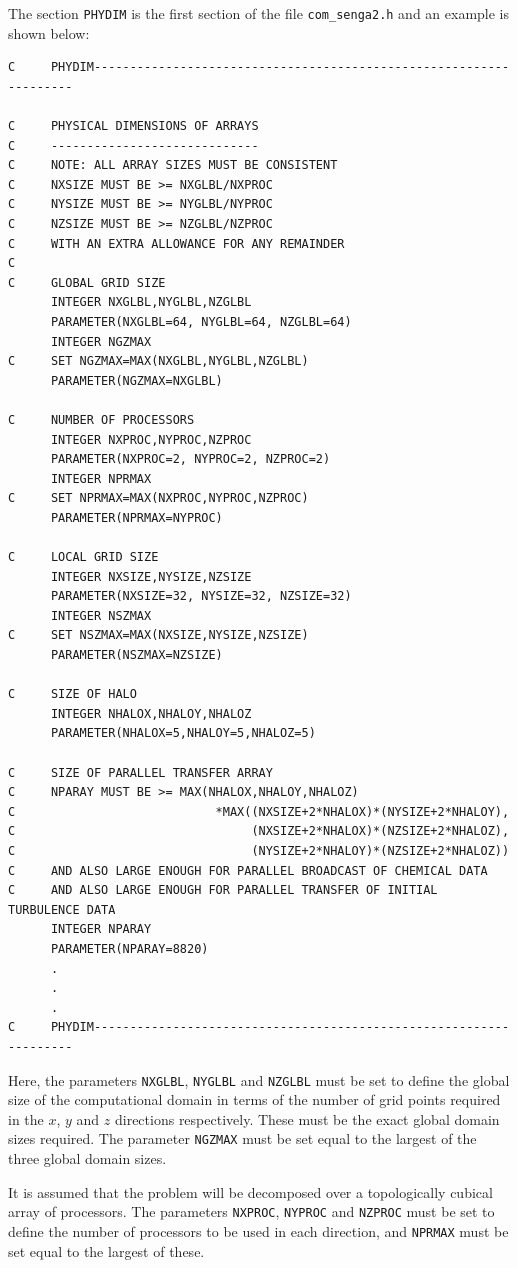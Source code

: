 \documentclass[dvips]{article}
\begin{document}
The section {\tt PHYDIM} is the first section of the file {\tt com\_senga2.h}
and an example is shown below:
\begin{verbatim}
C     PHYDIM-------------------------------------------------------------------

C     PHYSICAL DIMENSIONS OF ARRAYS
C     -----------------------------
C     NOTE: ALL ARRAY SIZES MUST BE CONSISTENT
C     NXSIZE MUST BE >= NXGLBL/NXPROC
C     NYSIZE MUST BE >= NYGLBL/NYPROC
C     NZSIZE MUST BE >= NZGLBL/NZPROC
C     WITH AN EXTRA ALLOWANCE FOR ANY REMAINDER
C     
C     GLOBAL GRID SIZE
      INTEGER NXGLBL,NYGLBL,NZGLBL
      PARAMETER(NXGLBL=64, NYGLBL=64, NZGLBL=64)
      INTEGER NGZMAX
C     SET NGZMAX=MAX(NXGLBL,NYGLBL,NZGLBL)
      PARAMETER(NGZMAX=NXGLBL)

C     NUMBER OF PROCESSORS
      INTEGER NXPROC,NYPROC,NZPROC
      PARAMETER(NXPROC=2, NYPROC=2, NZPROC=2)
      INTEGER NPRMAX
C     SET NPRMAX=MAX(NXPROC,NYPROC,NZPROC)
      PARAMETER(NPRMAX=NYPROC)

C     LOCAL GRID SIZE
      INTEGER NXSIZE,NYSIZE,NZSIZE
      PARAMETER(NXSIZE=32, NYSIZE=32, NZSIZE=32)
      INTEGER NSZMAX
C     SET NSZMAX=MAX(NXSIZE,NYSIZE,NZSIZE)
      PARAMETER(NSZMAX=NZSIZE)

C     SIZE OF HALO
      INTEGER NHALOX,NHALOY,NHALOZ
      PARAMETER(NHALOX=5,NHALOY=5,NHALOZ=5)

C     SIZE OF PARALLEL TRANSFER ARRAY
C     NPARAY MUST BE >= MAX(NHALOX,NHALOY,NHALOZ)
C                            *MAX((NXSIZE+2*NHALOX)*(NYSIZE+2*NHALOY),
C                                 (NXSIZE+2*NHALOX)*(NZSIZE+2*NHALOZ),
C                                 (NYSIZE+2*NHALOY)*(NZSIZE+2*NHALOZ))
C     AND ALSO LARGE ENOUGH FOR PARALLEL BROADCAST OF CHEMICAL DATA
C     AND ALSO LARGE ENOUGH FOR PARALLEL TRANSFER OF INITIAL TURBULENCE DATA
      INTEGER NPARAY
      PARAMETER(NPARAY=8820)
      .
      .
      .
C     PHYDIM-------------------------------------------------------------------
\end{verbatim}
Here, the parameters {\tt NXGLBL}, {\tt NYGLBL} and {\tt NZGLBL} must be
set to define the global size of the computational domain in terms of
the number of grid points required in the $x$, $y$ and $z$
directions respectively.  These must be the exact global domain sizes required.
The parameter {\tt NGZMAX} must be set equal to the largest of the
three global domain sizes.

It is assumed that the problem will be decomposed
over a topologically cubical array of processors.  The parameters {\tt NXPROC},
{\tt NYPROC} and {\tt NZPROC} must be set to define the number of processors to
be used in each direction, and {\tt NPRMAX} must be set equal to the largest of
these.
\end{document}
